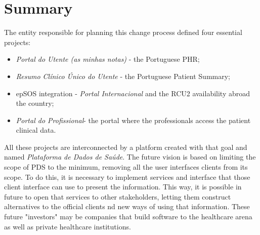 


\begin{landscape}
\centering     %
\end{landscape}

\section{Summary}


The entity responsible for planning this change process defined four essential projects:
\begin{itemize}
\item \textit{Portal do Utente (as minhas notas)} - the Portuguese PHR;
\item \textit{Resumo Clínico Único do Utente} - the Portuguese Patient Summary;
\item epSOS integration - \textit{Portal Internacional} and the RCU2 availability abroad the country;
\item \textit{Portal do Profissional}- the portal where the professionals access the patient clinical data.
\end{itemize}

All these projects are interconnected by a platform created with that goal and named \textit{Plataforma de Dados de Saúde}. The future vision is based on limiting the scope of PDS to the minimum, removing all the user interfaces clients from its scope. To do this, it is necessary to implement services and interface that those client interface can use to present the information. This way, it is possible in future to open that services to other stakeholders, letting them construct alternatives to the official clients nd new ways of using that information. These future "investors" may be companies that build software to the healthcare arena as well as private healthcare institutions.


